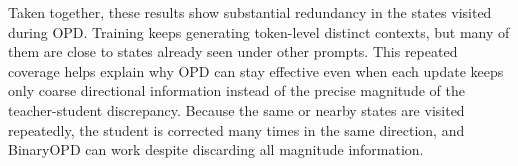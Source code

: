 \documentclass{article}
\theoremstyle{remark}
\begin{document}
Taken together, these results show substantial redundancy in the states visited during OPD. Training keeps generating token-level distinct contexts, but many of them are close to states already seen under other prompts. This repeated coverage helps explain why OPD can stay effective even when each update keeps only coarse directional information instead of the precise magnitude of the teacher-student discrepancy. Because the same or nearby states are visited repeatedly, the student is corrected many times in the same direction, and BinaryOPD can work despite discarding all magnitude information.



\end{document}
